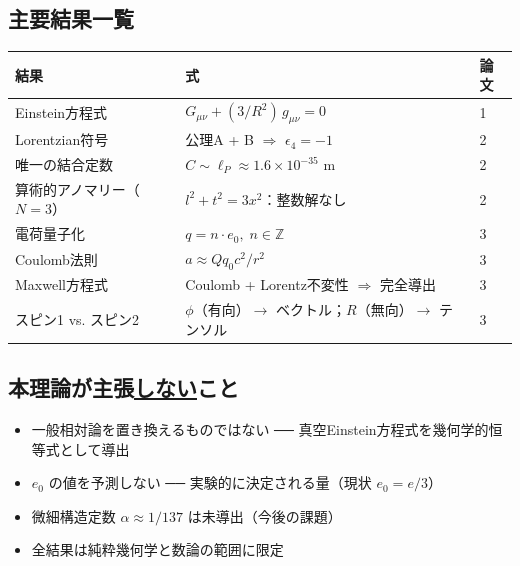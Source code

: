 \documentclass[11pt,a4paper]{ltjsarticle}
\begin{document}
\vspace{8pt}

\subsection*{主要結果一覧}

\vspace{-2pt}
\begin{center}
\begin{tabular}{lll}
\toprule
\textbf{結果} & \textbf{式} & \textbf{論文} \\
\midrule
Einstein方程式 & $G_{\mu\nu} + (3/R^2)\,g_{\mu\nu} = 0$ & 1 \\
Lorentzian符号 & 公理A + B $\Rightarrow$ $\epsilon_4 = -1$ & 2 \\
唯一の結合定数 & $C \sim \ell_P \approx 1.6 \times 10^{-35}$ m & 2 \\
算術的アノマリー（$N\!=\!3$） & $l^2 + t^2 = 3x^2$：整数解なし & 2 \\
電荷量子化 & $q = n \cdot e_0,\; n \in \mathbb{Z}$ & 3 \\
Coulomb法則 & $a \approx Qq_0 c^2 / r^2$ & 3 \\
Maxwell方程式 & Coulomb + Lorentz不変性 $\Rightarrow$ 完全導出 & 3 \\
スピン1 vs. スピン2 & $\phi$（有向）$\to$ ベクトル；$R$（無向）$\to$ テンソル & 3 \\
\bottomrule
\end{tabular}
\end{center}

\vspace{8pt}

\subsection*{本理論が主張\underline{しない}こと}

\vspace{-2pt}
\begin{itemize}
\item 一般相対論を置き換えるものではない ── 真空Einstein方程式を幾何学的恒等式として導出
\item $e_0$ の値を予測しない ── 実験的に決定される量（現状 $e_0 = e/3$）
\item 微細構造定数 $\alpha \approx 1/137$ は未導出（今後の課題）
\item 全結果は純粋幾何学と数論の範囲に限定
\end{itemize}

\vspace{8pt}
\end{document}
